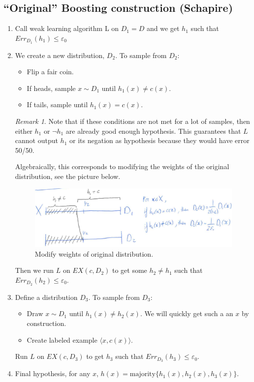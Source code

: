 \documentclass[12pt, letterpaper]{article}
\numberwithin{equation}{section} %
\newcommand{\ve}{\varepsilon}
\theoremstyle{definition}
\theoremstyle{remark}
\newtheorem{remark}[theorem]{Remark}
\begin{document}
\subsection{``Original'' Boosting construction (Schapire)}
\begin{enumerate}
\item Call weak learning algorithm L on $D_1 = D$ and we get $h_1$ such that $Err_{D_1}(h_1)\leq \ve_0$
\item We create a new distribution, $D_2$. To sample from $D_2$:
\begin{itemize}
\item Flip a fair coin.
\item If heads, sample $x\sim D_1$ until $h_1(x)\ne c(x)$.
\item If tails, sample until $h_1(x) = c(x)$. 
\end{itemize}
\begin{remark}
Note that if these conditions are not met for a lot of samples, then either $h_1$ or $\lnot h_1$ are already good enough hypothesis. This guarantees that $L$ cannot output $h_1$ or its negation as hypothesis because they would have error 50/50.
\end{remark}
Algebraically, this corresponds to modifying the weights of the original distribution, see the picture below.
\begin{figure}[H]
\centering
\includegraphics[width=0.6\linewidth]{img/weights.png}
\caption{Modify weights of original distribution.}
\end{figure}
Then we run $L$ on $EX(c,D_2)$ to get some $h_2\ne h_1$ such that $Err_{D_2}(h_2)\leq \ve_0$.
\item Define a distribution $D_3$. To sample from $D_3$:
\begin{itemize}
\item Draw $x\sim D_1$ until $h_1(x) \ne h_2(x)$. We will quickly get such a an $x$ by construction.
\item Create labeled example $\langle x, c(x) \rangle$.
\end{itemize}
Run $L$ on $EX(c, D_3)$ to get $h_3$ such that $Err_{D_3}(h_3)\leq \ve_0$.
\item Final hypothesis, for any $x$, $h(x) = \mathrm{majority}\lbrace h_1(x), h_2(x), h_3(x)\rbrace$.
\end{enumerate}
\end{document}
